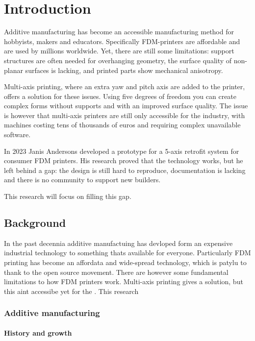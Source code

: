 \chapter{Introduction}
\label{chap:introduction}
Additive manufacturing has become an accessible manufacturing method for hobbyists, makers and educators. Specifically FDM-printers are affordable and are used by millions worldwide. Yet, there are still some limitations: support structures are often needed for overhanging geometry, the surface quality of non-planar surfaces is lacking, and printed parts show mechanical anisotropy.

Multi-axis printing, where an extra yaw and pitch axis are added to the printer, offers a solution for these issues. Using five degrees of freedom you can create complex forms without supports and with an improved surface quality. The issue is however that multi-axis printers are still only accessible for the industry, with machines costing tens of thousands of euros and requiring complex unavailable software.

In 2023 Janis Andersons developed a prototype for a 5-axis retrofit system for consumer FDM printers. His research proved that the technology works, but he left behind a gap: the design is still hard to reproduce, documentation is lacking and there is no community to support new builders.

This research will focus on filling this gap.

\section{Background}
\label{sec:intro-background}
In the past decennia additive manufactuing has devloped form an expensive industrial technology to something thats available for everyone. Particularly FDM printing has become an affordata and wide-spread technology, which is patylu to thank to the open source movement. There are however some fundamental limitations to how FDM printers work. Multi-axis printing gives a solution, but this aint accessibe yet for the . This research

\subsection{Additive manufacturing}
\label{subsec:intro-am}

\subsubsection{History and growth}
\label{subsubsec:intro-am-history}

